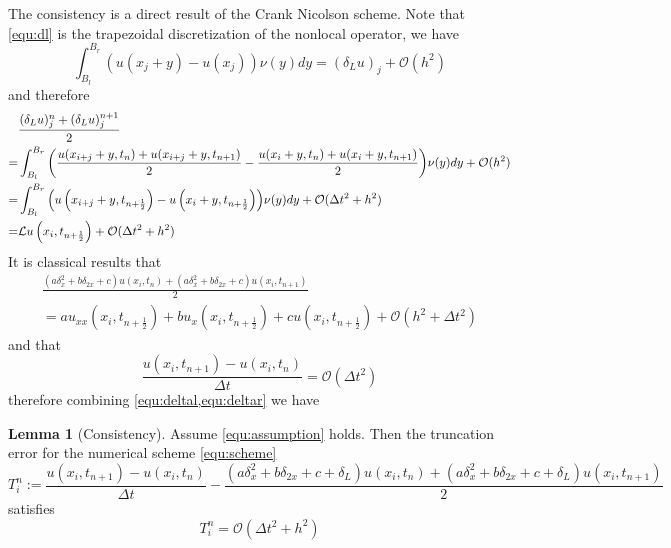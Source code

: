 \documentclass[10pt,a4paper]{article}
\theoremstyle{definition}
\newtheorem{lemma}{Lemma}
\begin{document}
The consistency is a direct result of the Crank Nicolson scheme. Note that \cref{equ:dl} is the trapezoidal discretization of the nonlocal operator, we have
\begin{equation}
	\int_{B_l}^{B_r} (u(x_j+y)-u(x_j))\nu(y)dy = (\delta_L u)_j + \mathcal{O}(h^2)
\end{equation}
and therefore
\begin{equation}\label{equ:deltal}
  \begin{aligned}
	&\frac{{({\delta _L}u)_j^n + ({\delta _L}u)_j^{n + 1}}}{2} \\
	=& \int_{{B_l}}^{{B_r}} {\left( {\frac{{u({x_{i + j}} + y,{t_n}) + u({x_{i + j}} + y,{t_{n + 1}})}}{2} - \frac{{u({x_i} + y,{t_n}) + u({x_i} + y,{t_{n + 1}})}}{2}} \right)} \nu (y)dy + \mathcal{O}( {h^2})\\
	 =& \int_{{B_l}}^{{B_r}} {\left( {u\left( {{x_{i + j}} + y,{t_{n + \frac{1}{2}}}} \right) - u\left( {{x_i} + y,{t_{n + \frac{1}{2}}}} \right)} \right)} \nu (y)dy + \mathcal{O}(\Delta {t^2} + {h^2})\\
	  =& {\cal L}u\left( {{x_i},{t_{n + \frac{1}{2}}}} \right) + \mathcal{O}(\Delta {t^2} + {h^2})
\end{aligned}
\end{equation}
It is classical results that
\begin{multline}\label{equ:deltar}
	\frac{{(a\delta _x^2 + b{\delta _{2x}} + c)u(x_i,t_n) + (a\delta _x^2 + b{\delta _{2x}} + c)u(x_i,t_{n+1})}}{2} \\= a{u_{xx}}\left( {{x_i},{t_{n + \frac{1}{2}}}} \right) + b{u_x}\left( {{x_i},{t_{n + \frac{1}{2}}}} \right) + cu\left( {{x_i},{t_{n + \frac{1}{2}}}} \right)+\mathcal{O}(h^2+\Delta t^2)
\end{multline}
and that
\[\frac{{u({x_i},{t_{n + 1}}) - u({x_i},{t_n})}}{{\Delta t}} = \mathcal{O}(\Delta t^2)\]
therefore combining \cref{equ:deltal,equ:deltar} we have
\begin{lemma}[Consistency]\label{lemma:consistency}
	Assume \cref{equ:assumption} holds. Then the truncation error for the numerical scheme \cref{equ:scheme}  
	\begin{equation}
		T^n_i := \frac{{u({x_i},{t_{n + 1}}) - u({x_i},{t_n})}}{{\Delta t}} - \frac{{(a\delta _x^2 + b{\delta _{2x}} + c + {\delta _L})u({x_i},{t_n}) + (a\delta _x^2 + b{\delta _{2x}} + c + {\delta _L})u({x_i},{t_{n + 1}})}}{2}
	\end{equation}
	satisfies
	\begin{equation}
		T^n_i = \mathcal{O}(\Delta t^2 + h^2)
	\end{equation}
\end{lemma}
\end{document}
